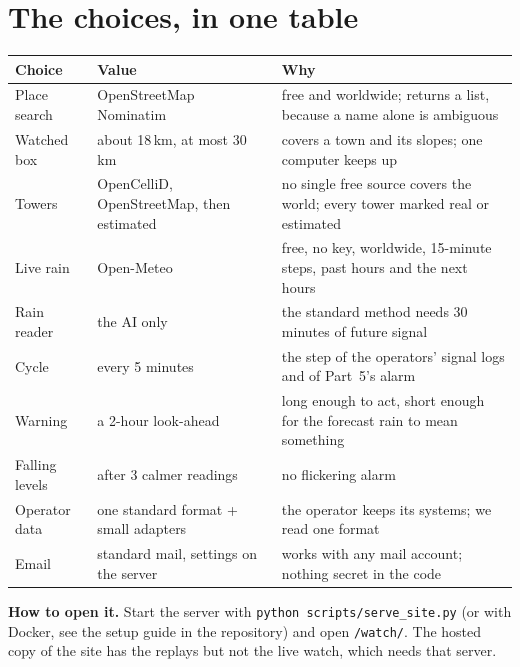 \section{The choices, in one table}
\label{sec:p7_choices}
\begin{center}\footnotesize\setlength{\tabcolsep}{4pt}
\begin{tabular}{>{\raggedright\arraybackslash}p{2.8cm}>{\raggedright\arraybackslash}p{3.6cm}>{\raggedright\arraybackslash}p{6.9cm}}
\toprule
Choice & Value & Why\\
\midrule
Place search & OpenStreetMap Nominatim & free and worldwide; returns a list, because a name alone is ambiguous\\
Watched box & about 18\,km, at most 30\,km & covers a town and its slopes; one computer keeps up\\
Towers & OpenCelliD, OpenStreetMap, then estimated & no single free source covers the world; every tower marked real or
estimated\\
Live rain & Open-Meteo & free, no key, worldwide, 15-minute steps, past hours and the next hours\\
Rain reader & the AI only & the standard method needs 30 minutes of future signal\\
Cycle & every 5 minutes & the step of the operators' signal logs and of Part~5's alarm\\
Warning & a 2-hour look-ahead & long enough to act, short enough for the forecast rain to mean something\\
Falling levels & after 3 calmer readings & no flickering alarm\\
Operator data & one standard format + small adapters & the operator keeps its systems; we read one format\\
Email & standard mail, settings on the server & works with any mail account; nothing secret in the code\\
\bottomrule
\end{tabular}
\end{center}

\textbf{How to open it.} Start the server with \texttt{python scripts/serve\_site.py} (or with Docker, see the setup guide
in the repository) and open \texttt{/watch/}. The hosted copy of the site has the replays but not the live watch, which
needs that server.

